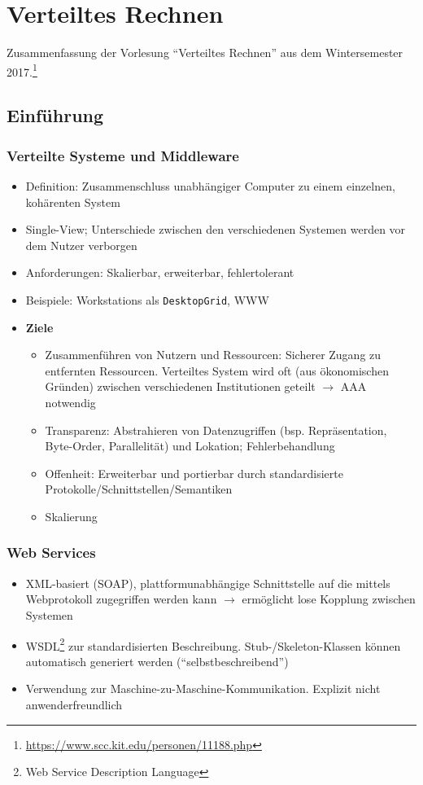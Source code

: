 \chapter{Verteiltes Rechnen}

Zusammenfassung der Vorlesung "`Verteiltes Rechnen"' aus dem Wintersemester 2017.\footnote{\url{https://www.scc.kit.edu/personen/11188.php}}

\section{Einführung}

\subsection{Verteilte Systeme und Middleware}
\begin{itemize}
	\item Definition: Zusammenschluss unabhängiger Computer zu einem einzelnen, kohärenten System
	\item Single-View; Unterschiede zwischen den verschiedenen Systemen werden vor dem Nutzer verborgen
	\item Anforderungen: Skalierbar, erweiterbar, fehlertolerant
	\item Beispiele: Workstations als \texttt{DesktopGrid}, WWW
	\item \textbf{Ziele}
	\begin{itemize}
		\item Zusammenführen von Nutzern und Ressourcen: Sicherer Zugang zu entfernten Ressourcen. Verteiltes System wird oft (aus ökonomischen Gründen) zwischen verschiedenen Institutionen geteilt \(\rightarrow\) AAA notwendig
		\item Transparenz: Abstrahieren von Datenzugriffen (bsp. Repräsentation, Byte-Order, Parallelität) und Lokation; Fehlerbehandlung
		\item Offenheit: Erweiterbar und portierbar durch standardisierte Protokolle/Schnittstellen/Semantiken
		\item Skalierung
	\end{itemize}
\end{itemize}


\subsection{Web Services}
\begin{itemize}
	\item XML-basiert (SOAP), plattformunabhängige Schnittstelle auf die mittels Webprotokoll zugegriffen werden kann \(\rightarrow\) ermöglicht lose Kopplung zwischen Systemen
	\item WSDL\footnote{Web Service Description Language} zur standardisierten Beschreibung. Stub-/Skeleton-Klassen können automatisch generiert werden ("`selbstbeschreibend"')
	\item Verwendung zur Maschine-zu-Maschine-Kommunikation. Explizit nicht anwenderfreundlich
\end{itemize}


